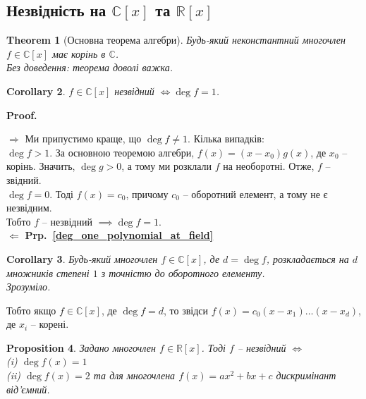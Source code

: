 \documentclass[a4paper, 10pt]{article}
\makeatletter
\def\rightproof{$\boxed{\Rightarrow}$ }
\def\leftproof{$\boxed{\Leftarrow}$ }
\theoremstyle{theoremdd}
\newtheorem{theorem}{Theorem}[subsection]
\theoremstyle{theoremdd}
\theoremstyle{theoremdd}
\theoremstyle{theoremdd}
\theoremstyle{theoremdd}
\theoremstyle{theoremdd}
\theoremstyle{theoremdd}
\theoremstyle{theoremdd}
\theoremstyle{theoremdd}
\newtheorem{proposition}[theorem]{Proposition}
\theoremstyle{theoremdd}
\theoremstyle{theoremdd}
\theoremstyle{theoremdd}
\theoremstyle{theoremdd}
\theoremstyle{theoremdd}
\newtheorem{corollary}[theorem]{Corollary}
\theoremstyle{theoremdd}
\renewenvironment{proof}[1][Proof.\\]{\par
\pushQED{\hfill \qed}%
\normalfont \topsep6\p@\@plus6\p@\relax
\trivlist
\item\relax
{\bfseries
#1\@addpunct{.}}\hspace\labelsep\ignorespaces
}{%
\popQED\endtrivlist\@endpefalse
}
\newcommand\prpref[1]{\textbf{Prp.~\ref{#1}}}
\makeatother
\begin{document}
\subsection{Незвідність на $\mathbb{C}[x]$ та $\mathbb{R}[x]$}
\begin{theorem}[Основна теорема алгебри]
Будь-який неконстантний многочлен $f \in \mathbb{C}[x]$ має корінь в $\mathbb{C}$.\\
\textit{Без доведення: теорема доволі важка.}
\end{theorem}

\begin{corollary}
$f \in \mathbb{C}[x]$ незвідний $\iff \deg f = 1$.
\end{corollary}

\begin{proof}
\rightproof Ми припустимо краще, що $\deg f \neq 1$. Кілька випадків: \\
$\deg f > 1$. За основною теоремою алгебри, $f(x) = (x-x_0)g(x)$, де $x_0$ -- корінь. Значить, $\deg g > 0$, а тому ми розклали $f$ на необоротні. Отже, $f$ -- звідний.\\
$\deg f = 0$. Тоді $f(x) = c_0$, причому $c_0$ -- оборотний елемент, а тому не є незвідним.\\
Тобто $f$ -- незвідний $\implies \deg f = 1$.
\bigskip \\
\leftproof \prpref{deg_one_polynomial_at_field}
\end{proof}

\begin{corollary}
Будь-який многочлен $f \in \mathbb{C}[x]$, де $d = \deg f$, розкладається на $d$ множників степені $1$ з точністю до оборотного елементу.\\
\textit{Зрозуміло.}
\end{corollary}

Тобто якщо $f \in \mathbb{C}[x]$, де $\deg f = d$, то звідси $f(x) = c_0(x-x_1) \dots (x-x_d)$, де $x_i$ -- корені.

\begin{proposition}
Задано многочлен $f \in \mathbb{R}[x]$. Тоді $f$ -- незвідний $\iff$\\
(i) $\deg f(x) = 1$\\
(ii) $\deg f(x) = 2$ та для многочлена $f(x) = ax^2 + bx + c$ дискримінант від'ємний.
\end{proposition}
\end{document}
